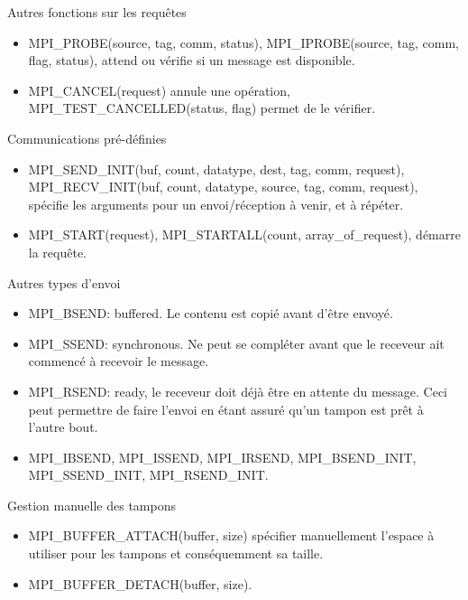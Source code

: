 \documentclass[10pt]{beamer}
\begin{document}
\begin{frame}{Autres fonctions sur les requêtes}

  \begin{itemize}
    \item MPI\_PROBE(source, tag, comm, status), MPI\_IPROBE(source, tag, comm, flag, status), attend ou vérifie si un message est disponible.

    \item MPI\_CANCEL(request) annule une opération, MPI\_TEST\_CANCELLED(status, flag) permet de le vérifier.
  \end{itemize}
\end{frame}

\begin{frame}{Communications pré-définies}

  \begin{itemize}
    \item MPI\_SEND\_INIT(buf, count, datatype, dest, tag, comm, request), MPI\_RECV\_INIT(buf, count, datatype, source, tag, comm, request), spécifie les arguments pour un envoi/réception à venir, et à répéter.

    \item MPI\_START(request), MPI\_STARTALL(count, array\_of\_request), démarre la requête.
  \end{itemize}
\end{frame}

\begin{frame}{Autres types d'envoi}

  \begin{itemize}
    \item MPI\_BSEND: buffered. Le contenu est copié avant d'être envoyé.

    \item MPI\_SSEND: synchronous. Ne peut se compléter avant que le receveur ait commencé à recevoir le message.

    \item MPI\_RSEND: ready, le receveur doit déjà être en attente du message. Ceci peut permettre de faire l'envoi en étant assuré qu'un tampon est prêt à l'autre bout.

    \item MPI\_IBSEND, MPI\_ISSEND, MPI\_IRSEND, MPI\_BSEND\_INIT, MPI\_SSEND\_INIT, MPI\_RSEND\_INIT.
  \end{itemize}
\end{frame}

\begin{frame}{Gestion manuelle des tampons}

  \begin{itemize}
    \item MPI\_BUFFER\_ATTACH(buffer, size) spécifier manuellement l'espace à utiliser pour les tampons et conséquemment sa taille.

    \item MPI\_BUFFER\_DETACH(buffer, size).
  \end{itemize}
\end{frame}
\end{document}
